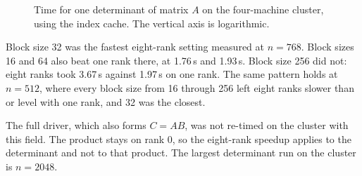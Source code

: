 \begin{figure}[!t]
\centering
{}
\caption{Time for one determinant of matrix \(A\) on the four-machine cluster, using the index cache. The vertical axis is logarithmic.}
\label{fig:mpi}
\end{figure}

Block size 32 was the fastest eight-rank setting measured at \(n = 768\).
Block sizes 16 and 64 also beat one rank there, at 1.76\,s and 1.93\,s.
Block size 256 did not: eight ranks took 3.67\,s against 1.97\,s on one rank.
The same pattern holds at \(n = 512\), where every block size from 16 through 256 left eight ranks slower than or level with one rank, and 32 was the closest.

The full driver, which also forms \(C = AB\), was not re-timed on the cluster with this field.
The product stays on rank 0, so the eight-rank speedup applies to the determinant and not to that product.
The largest determinant run on the cluster is \(n = 2048\).
